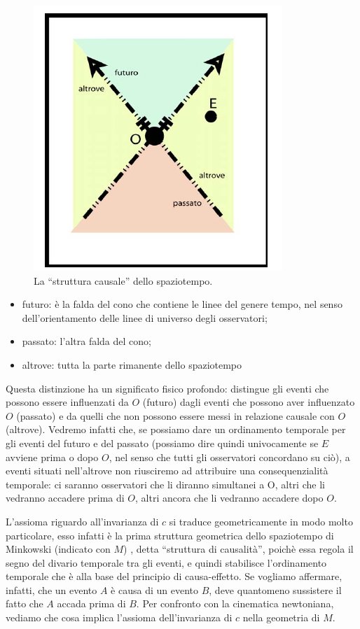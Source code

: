 \begin{figure}[htbp]
   \centering
   \includegraphics[scale=0.7]{immagini/minkowski/struttura_causale}
   \caption{\label{struttura_causale} La ``struttura causale'' dello spaziotempo.}
\end{figure}

\begin{itemize}
 \item futuro: è la falda del cono che contiene le linee del genere tempo, nel
senso dell'orientamento delle linee di universo degli osservatori;
 \item passato: l'altra falda del cono;
 \item altrove: tutta la parte rimanente dello spaziotempo
\end{itemize}

Questa distinzione ha un significato fisico profondo: distingue gli eventi
che possono essere influenzati da $O$ (futuro) dagli eventi che possono aver
influenzato $O$ (passato) e da quelli che non possono essere messi in relazione
causale con $O$ (altrove). Vedremo infatti che, se possiamo dare un ordinamento 
temporale per gli eventi del futuro e del passato (possiamo dire quindi
univocamente se $E$ avviene prima o dopo $O$, nel senso che tutti gli osservatori
concordano su ciò), a eventi situati nell'altrove non riusciremo ad attribuire
una consequenzialità temporale: ci saranno osservatori che li diranno simultanei a O, 
altri che li vedranno accadere prima di $O$, altri ancora che li
vedranno accadere dopo $O$.

L'assioma riguardo all'invarianza di $c$ si traduce geometricamente in modo molto
particolare, esso infatti è la prima struttura geometrica dello spaziotempo di Minkowski 
(indicato con $M$) , detta ``struttura di causalità'', poichè
essa regola il segno del divario temporale tra gli eventi, e quindi stabilisce
l'ordinamento temporale che è alla base del principio di causa-effetto. Se
vogliamo affermare, infatti, che un evento $A$ è causa di un evento $B$, deve
quantomeno sussistere il fatto che $A$ accada prima di $B$. Per confronto con
la cinematica newtoniana, vediamo che cosa implica l'assioma dell'invarianza
di $c$ nella geometria di $M$.


